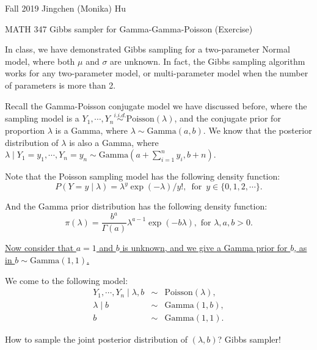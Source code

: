 \documentclass[11pt]{article}
\begin{document}
\enlargethispage{\baselineskip}

Fall 2019 \hfill Jingchen (Monika) Hu\\

\begin{center}
{\huge MATH 347 Gibbs sampler for Gamma-Gamma-Poisson (Exercise)}
\end{center}
\vspace{0.5cm}


In class, we have demonstrated Gibbs sampling for a two-parameter Normal model, where both $\mu$ and $\sigma$ are unknown. In fact, the Gibbs sampling algorithm works for any two-parameter model, or multi-parameter model when the number of parameters is more than 2. 

Recall the Gamma-Poisson conjugate model we have discussed before, where the sampling model is a $Y_1, \cdots, Y_n \overset{i.i.d.}{\sim} \textrm{Poisson}(\lambda)$, and the conjugate prior for proportion $\lambda$ is a Gamma, where $\lambda \sim \textrm{Gamma}(a, b)$. We know that the posterior distribution of $\lambda$ is also a Gamma, where $\lambda \mid Y_1 = y_1, \cdots, Y_n = y_n \sim \textrm{Gamma}(a + \sum_{i=1}^{n}y_i, b + n)$. 

Note that the Poisson sampling model has the following density function:
\begin{equation}
P(Y = y \mid \lambda) = \lambda^{y}\exp(-\lambda)/y!, \,\,\, \text{for}\,\,\, y \in \{0, 1, 2, \cdots\}.
\end{equation}

And the Gamma prior distribution has the following density function:
\begin{equation}
\pi(\lambda) = \frac{b^a}{\Gamma(a)}\lambda^{a-1}\exp(-b\lambda),\,\, \text{for}\,\, \lambda, a, b >0.
\end{equation}

{\underline{Now consider that $a = 1$ and $b$ is unknown, and we give a Gamma prior for $b$, as in $b \sim \textrm{Gamma}(1, 1)$.}} 

We come to the following model:
\begin{eqnarray}
Y_1, \cdots, Y_n  \mid \lambda, b &\sim& \textrm{Poisson}(\lambda), \\
\lambda \mid b &\sim& \textrm{Gamma}(1, b), \\
b &\sim& \textrm{Gamma}(1, 1).
\end{eqnarray}

How to sample the joint posterior distribution of $(\lambda, b)$? Gibbs sampler!
\end{document}
